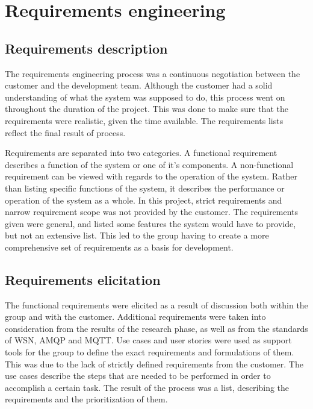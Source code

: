 
\chapter{Requirements engineering}
\label{ch:requirements_engineering}

\section{Requirements description}

The requirements engineering process was a continuous negotiation between the customer and the development team. Although the customer had a solid understanding of what the system was supposed to do, this process went on throughout the duration of the project. This was done to make sure that the requirements were realistic, given the time available. The requirements lists reflect the final result of process.

Requirements are separated into two categories. A functional requirement describes a function of the system or one of it's components. A non-functional requirement can be viewed with regards to the operation of the system. Rather than listing specific functions of the system, it describes the performance or operation of the system as a whole. In this project, strict requirements and narrow requirement scope was not provided by the customer. The requirements given were general, and listed some features the system would have to provide, but not an extensive list. This led to the group having to create a more comprehensive set of requirements as a basis for development.

\section{Requirements elicitation}
\label{sec:requirements_engineering-requirements_elicitation}

The functional requirements were elicited as a result of discussion both within the group and with the customer. Additional requirements were taken into consideration from the results of the research phase, as well as from the standards of WSN, AMQP and MQTT. Use cases and user stories were used as support tools for the group to define the exact requirements and formulations of them. This was due to the lack of strictly defined requirements from the customer. The use cases describe the steps that are needed to be performed in order to accomplish a certain task. The result of the process was a list, describing the requirements and the prioritization of them.

